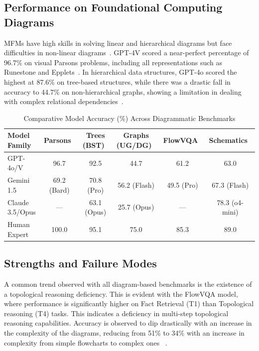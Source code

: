 \documentclass[sigconf, nonacm]{acmart}
\begin{document}
\subsection{Performance on Foundational Computing Diagrams}
MFMs have high skills in solving linear and hierarchical diagrams but face 
difficulties in non-linear diagrams~\cite{gutierrez2024seeing, hou2024more}. 
GPT-4V scored a near-perfect percentage of 96.7\% on visual Parsons problems, 
including all representations such as Runestone and Epplets~\cite{hou2024more}.
In hierarchical data structures, GPT-4o scored the highest at 87.6\% on 
tree-based structures, while there was a drastic fall in accuracy to 44.7\% 
on non-hierarchical graphs, showing a limitation in dealing with complex 
relational dependencies~\cite{gutierrez2024seeing}.

\begin{table}
\caption{Comparative Model Accuracy (\%) Across Diagrammatic Benchmarks}
\label{tab:accuracy}
\begin{tabular}{lccccc}
\toprule
\textbf{Model Family} & \textbf{Parsons~\cite{hou2024more}} & \textbf{Trees (BST)~\cite{gutierrez2024seeing}} & \textbf{Graphs (UG/DG)~\cite{gutierrez2024seeing}} & \textbf{FlowVQA~\cite{singh2024flowvqa}} & \textbf{Schematics~\cite{zhao2025missqa}} \\
\midrule
GPT-4o/V & 96.7 & 92.5 & 44.7 & 61.2 & 63.0 \\
Gemini 1.5 & 69.2 (Bard) & 70.8 (Pro) & 56.2 (Flash) & 49.5 (Pro) & 67.3 (Flash) \\
Claude 3.5/Opus & --- & 63.1 (Opus) & 25.7 (Opus) & --- & 78.3 (o4-mini) \\
Human Expert & 100.0 & 95.1 & 75.0 & 85.3 & 89.0 \\
\bottomrule
\end{tabular}
\end{table}

\subsection{Strengths and Failure Modes}
A common trend observed with all diagram-based benchmarks is the existence 
of a topological reasoning deficiency. This is evident with the FlowVQA model, 
where performance is significantly higher on Fact Retrieval (T1) than 
Topological reasoning (T4) tasks. This indicates a deficiency in multi-step 
topological reasoning capabilities. Accuracy is observed to dip drastically 
with an increase in the complexity of the diagrams, reducing from 51\% to 34\% 
with an increase in complexity from simple flowcharts to complex ones~%
\cite{singh2024flowvqa}.
\end{document}
